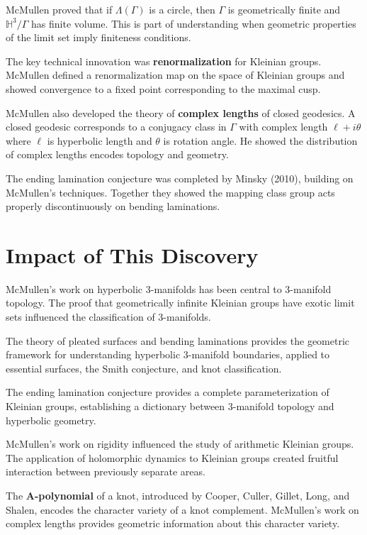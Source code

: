 McMullen proved that if $\Lambda(\Gamma)$ is a circle, then
$\Gamma$ is geometrically finite and $\mathbb{H}^3/\Gamma$ has
finite volume.  This is part of understanding when geometric
properties of the limit set imply finiteness conditions.

The key technical innovation was \textbf{renormalization} for
Kleinian groups.  McMullen defined a renormalization map on the
space of Kleinian groups and showed convergence to a fixed point
corresponding to the maximal cusp.

McMullen also developed the theory of \textbf{complex lengths} of
closed geodesics.  A closed geodesic corresponds to a conjugacy
class in $\Gamma$ with complex length $\ell+i\theta$ where $\ell$
is hyperbolic length and $\theta$ is rotation angle.  He showed the
distribution of complex lengths encodes topology and geometry.

The ending lamination conjecture was completed by Minsky (2010),
building on McMullen's techniques.  Together they showed the
mapping class group acts properly discontinuously on bending
laminations.

\section{Impact of This Discovery}

McMullen's work on hyperbolic 3-manifolds has been central to
3-manifold topology.  The proof that geometrically infinite
Kleinian groups have exotic limit sets influenced the
classification of 3-manifolds.

The theory of pleated surfaces and bending laminations provides
the geometric framework for understanding hyperbolic 3-manifold
boundaries, applied to essential surfaces, the Smith conjecture,
and knot classification.

The ending lamination conjecture provides a complete
parameterization of Kleinian groups, establishing a dictionary
between 3-manifold topology and hyperbolic geometry.

McMullen's work on rigidity influenced the study of arithmetic
Kleinian groups.  The application of holomorphic dynamics to
Kleinian groups created fruitful interaction between previously
separate areas.

The \textbf{A-polynomial} of a knot, introduced by Cooper, Culler,
Gillet, Long, and Shalen, encodes the character variety of a knot
complement.  McMullen's work on complex lengths provides geometric
information about this character variety.

